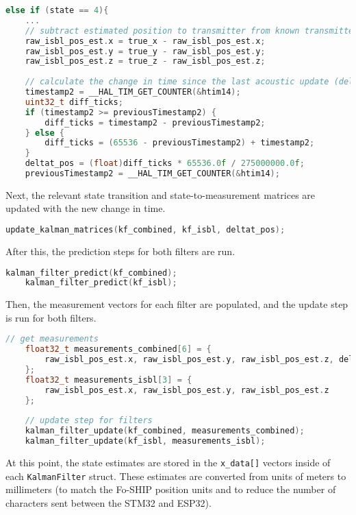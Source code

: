 \documentclass[11pt]{ucthesisCP}
\begin{document}
\begin{lstlisting}[language=C++]
else if (state == 4){
	...
	// subtract estimated position to transmitter from known transmitter location to get receiver position in global frame
	raw_isbl_pos_est.x = true_x - raw_isbl_pos_est.x;
	raw_isbl_pos_est.y = true_y - raw_isbl_pos_est.y;
	raw_isbl_pos_est.z = true_z - raw_isbl_pos_est.z;
	
	// calculate the change in time since the last acoustic update (deltat_pos)
	timestamp2 = __HAL_TIM_GET_COUNTER(&htim14);
	uint32_t diff_ticks;
	if (timestamp2 >= previousTimestamp2) {
		diff_ticks = timestamp2 - previousTimestamp2;
	} else {
		diff_ticks = (65536 - previousTimestamp2) + timestamp2;
	}
	deltat_pos = (float)diff_ticks * 65536.0f / 275000000.0f;
	previousTimestamp2 = __HAL_TIM_GET_COUNTER(&htim14);
\end{lstlisting}

Next, the relevant state transition and state-to-measurement matrices are updated with the new change in time.

\begin{lstlisting}[language=C++]
	update_kalman_matrices(kf_combined, kf_isbl, deltat_pos);
\end{lstlisting}

After this, the prediction steps for both filters are run.

\begin{lstlisting}[language=C++]
	kalman_filter_predict(kf_combined);
	kalman_filter_predict(kf_isbl);
\end{lstlisting}

Then, the measurement vectors for each filter are populated, and the update step is run for both filters.

\begin{lstlisting}[language=C++]
	// get measurements
	float32_t measurements_combined[6] = {
		raw_isbl_pos_est.x, raw_isbl_pos_est.y, raw_isbl_pos_est.z, delta_x_imu.x, delta_x_imu.y, delta_x_imu.z
	};
	float32_t measurements_isbl[3] = {
		raw_isbl_pos_est.x, raw_isbl_pos_est.y, raw_isbl_pos_est.z
	};
	
	// update step for filters
	kalman_filter_update(kf_combined, measurements_combined);
	kalman_filter_update(kf_isbl, measurements_isbl);
\end{lstlisting}

At this point, the state estimates are stored in the \verb|x_data[]| vectors inside of each \verb|KalmanFilter| struct. These estimates are converted from units of meters to millimeters (to match the Fo-SHIP position units and to reduce the number of characters sent between the STM32 and ESP32). 
\end{document}
